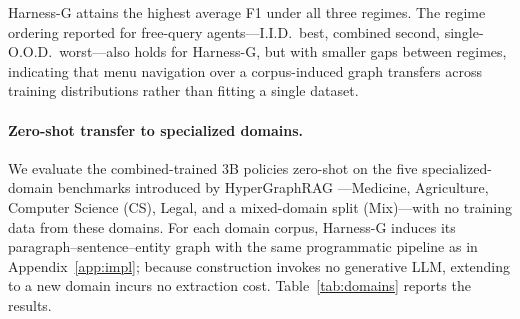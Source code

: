 \documentclass[letterpaper]{article} %
\begin{document}
Harness-G attains the highest average F1 under all three regimes.
The regime ordering reported for free-query agents---I.I.D.\ best, combined second, single-O.O.D.\ worst---also holds for Harness-G, but with smaller gaps between regimes, indicating that menu navigation over a corpus-induced graph transfers across training distributions rather than fitting a single dataset.

\paragraph{Zero-shot transfer to specialized domains.}
We evaluate the combined-trained 3B policies zero-shot on the five specialized-domain benchmarks introduced by HyperGraphRAG \citep{luo2025hypergraphrag}---Medicine, Agriculture, Computer Science (CS), Legal, and a mixed-domain split (Mix)---with no training data from these domains.
For each domain corpus, Harness-G induces its paragraph--sentence--entity graph with the same programmatic pipeline as in Appendix~\ref{app:impl}; because construction invokes no generative LLM, extending to a new domain incurs no extraction cost.
Table~\ref{tab:domains} reports the results.
\end{document}
